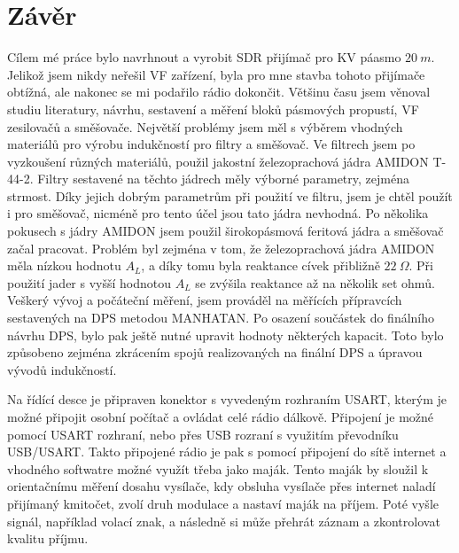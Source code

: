 \section*{Závěr}
\indent\indent Cílem mé práce bylo navrhnout a vyrobit SDR přijímač pro KV páasmo $20~m$. Jelikož jsem nikdy neřešil VF zařízení, byla pro mne stavba tohoto přijímače obtížná, ale nakonec se mi podařilo rádio dokončit. Většinu času jsem věnoval studiu literatury, návrhu, sestavení a měření bloků pásmových propustí, VF zesilovačů a směšovače. Největší problémy jsem měl s výběrem vhodných materiálů pro výrobu indukčností pro filtry a směšovač. Ve filtrech jsem po vyzkoušení různých materiálů, použil jakostní železoprachová jádra AMIDON T-44-2. Filtry sestavené na těchto jádrech měly výborné parametry, zejména strmost. Díky jejich dobrým parametrům při použití ve filtru, jsem je chtěl použít i pro směšovač, nicméně pro tento účel jsou tato jádra nevhodná. Po několika pokusech s jádry AMIDON jsem použil širokopásmová feritová jádra a směšovač začal pracovat. Problém byl zejména v tom, že železoprachová jádra AMIDON měla nízkou hodnotu $A_L$, a díky tomu byla reaktance cívek přibližně $22~\Omega$. Při použití jader s vyšší hodnotou $A_L$ se zvýšila reaktance až na několik set ohmů. Veškerý vývoj a počáteční měření, jsem prováděl na měřících přípravcích sestavených na DPS metodou MANHATAN. Po osazení součástek do finálního návrhu DPS, bylo pak ještě nutné upravit hodnoty některých kapacit. Toto bylo způsobeno zejména zkrácením spojů realizovaných na finální DPS a úpravou vývodů indukčností. 

Na řídící desce je připraven konektor s vyvedeným rozhraním USART, kterým je možné 
připojit osobní počítač a ovládat celé rádio dálkově. Připojení je možné pomocí USART rozhraní, nebo přes USB rozraní s využitím převodníku USB/USART.  Takto připojené rádio je pak s pomocí připojení do sítě internet a vhodného softwatre možné využít třeba jako maják. Tento maják by sloužil k orientačnímu měření dosahu vysílače, kdy obsluha vysílače přes internet naladí přijímaný kmitočet, zvolí druh modulace a nastaví maják na příjem. Poté vyšle signál, například volací znak, a následně si může přehrát záznam a zkontrolovat kvalitu příjmu.

